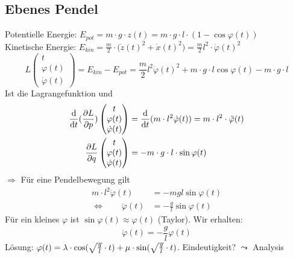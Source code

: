 \subsection{Ebenes Pendel} %
\label{sub:103}
\begin{figure}[h]
\end{figure}
Potentielle Energie: $E_{pot} = m \cdot g \cdot z(t) = m \cdot g \cdot l \cdot (1-\cos \varphi(t))$  \\
Kinetische Energie: $E_{kin} = \frac{m}{2} \cdot  \big( \dot z(t)^2 + \dot x(t)^2 \big) = \frac{m}{2} l^2 \cdot \dot \varphi(t)^2$
\[
	L \begin{pmatrix}
		t \\ \varphi(t) \\ \dot \varphi(t)
	\end{pmatrix} = E_{kin} - E_{pot} = \frac{m}{2} l^2 \dot \varphi(t)^2 + m \cdot g \cdot l \cos \varphi(t) - m \cdot g \cdot l
\]
Ist die Lagrangefunktion und 
\begin{align*}
	\frac{\mathrm{d} }{\mathrm{d} t}   ( \frac{{\partial L}}{{\partial p}}  ) \begin{pmatrix}
		t \\ \varphi(t) \\ \dot \varphi(t)
	\end{pmatrix} &= \frac{\mathrm{d} }{\mathrm{d} t}  (m \cdot l ^2 \dot \varphi(t)) = m \cdot l^2 \cdot  \ddot \varphi(t) \\
	\frac{{\partial L}}{{\partial q}}  \begin{pmatrix}
		t \\ \varphi(t) \\ \dot \varphi(t)
	\end{pmatrix} &= - m \cdot g \cdot l \cdot \sin \varphi(t)
\end{align*}
$\Rightarrow $ Für eine Pendelbewegung gilt 
\begin{align*}
	m \cdot l^2 \ddot \varphi (t) &= - m g l \sin \varphi(t) \\
	\Leftrightarrow \qquad \ddot \varphi(t) &= - \frac{g}{l} \sin \varphi(t) 
\end{align*}
Für ein kleines $\varphi$ ist $\sin \varphi(t) \approx \varphi(t)$ (Taylor). Wir erhalten:
\[
	\ddot \varphi(t) = - \frac{g}{l} \varphi(t) 
\]
Lösung: $\varphi(t) = \lambda \cdot \cos (\sqrt{\frac{g}{l} }\cdot t  ) + \mu \cdot  \sin (\sqrt{\frac{g}{l} } \cdot t )  $. Eindeutigkeit? $\leadsto$
Analysis 

